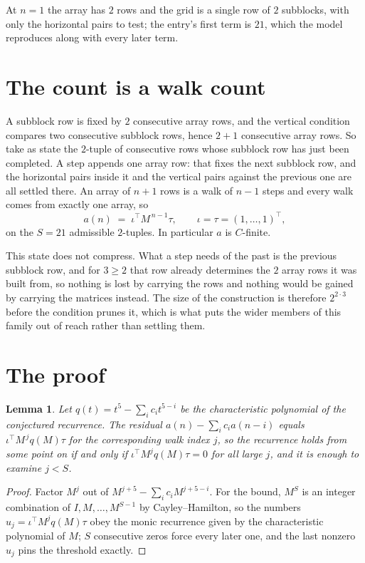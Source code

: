 \documentclass[11pt,a4paper]{article}
\theoremstyle{plain}
\newtheorem{lemma}[theorem]{Lemma}
\theoremstyle{definition}
\begin{document}
At $n=1$ the array has $2$ rows and the grid is a single row of $2$
subblocks, with only the horizontal pairs to test; the entry's first term is
$21$, which the model reproduces along with every later term.

\section{The count is a walk count}

A subblock row is fixed by $2$ consecutive array rows, and the vertical condition compares
two consecutive subblock rows, hence $2+1$ consecutive array rows. So take as state the
$2$-tuple of consecutive rows whose subblock row has just been completed. A step appends one
array row: that fixes the next subblock row, and the horizontal pairs inside it and the
vertical pairs against the previous one are all settled there. An array of $n+1$ rows is
a walk of $n-1$ steps and every walk comes from exactly one array, so
\[
a(n)\;=\;\iota^{\!\top}M^{\,n-1}\tau,\qquad\iota=\tau=(1,\dots,1)^{\!\top},
\]
on the $S=21$ admissible $2$-tuples. In particular $a$ is $C$-finite.

This state does not compress. What a step needs of the past is the previous subblock row, and
for $3\ge2$ that row already determines the $2$ array rows it was built from, so nothing
is lost by carrying the rows and nothing would be gained by carrying the matrices instead. The
size of the construction is therefore $2^{2\cdot3}$ before the condition prunes
it, which is what puts the wider members of this family out of reach rather than settling them.

\section{The proof}

\begin{lemma}\label{lem:crit}
Let $q(t)=t^{5}-\sum_i c_it^{5-i}$ be the characteristic polynomial of the
conjectured recurrence. The residual $a(n)-\sum_ic_ia(n-i)$ equals
$\iota^{\!\top}M^{\,j}q(M)\tau$ for the corresponding walk index $j$, so the recurrence
holds from some point on if and only if $\iota^{\!\top}M^{j}q(M)\tau=0$ for all large $j$,
and it is enough to examine $j<S$.
\end{lemma}

\begin{proof}
Factor $M^{j}$ out of $M^{j+5}-\sum_ic_iM^{j+5-i}$. For the bound, $M^{S}$
is an integer combination of $I,M,\dots,M^{S-1}$ by Cayley--Hamilton, so the numbers
$u_j=\iota^{\!\top}M^{j}q(M)\tau$ obey the monic recurrence given by the characteristic
polynomial of $M$; $S$ consecutive zeros force every later one, and the last nonzero $u_j$
pins the threshold exactly.
\end{proof}
\end{document}

